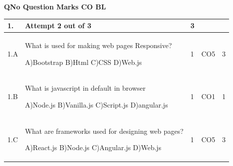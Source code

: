 \documentclass[12pt]{article}
\begin{document}
	\begin{flushleft}
	\bf{QNo}\hspace{1.2cm} \bf{Question} \hspace{5.5cm}  \bf{Marks} \hspace{0.2cm} \bf{CO} \hspace{0.2cm}	\bf{BL}	
	
\end{flushleft} 
	\begin{tabular}{|L{1cm}|L{8cm}|C{1cm}|C{1cm}|C{1cm}|}\hline
		\bf{1}. & \bf{Attempt} \bf2 \bf{out} of \bf3 & \bf3  & & \\ \hline
				1.A & What is used for making web pages Responsive? \newline
					
		A)Bootstrap\newline
		B)Html\newline
		C)CSS\newline
		D)Web.js &
		1 &
		CO5&
		3 \\ \hline
		
				1.B & What is javascript in default in browser \newline
					
		A)Node.js\newline
		B)Vanilla.js\newline
		C)Script.js\newline
		D)angular.js &
		1 &
		CO1&
		1 \\ \hline
		
				1.C & What are frameworks used for designing web pages? \newline
					
		A)React.js\newline
		B)Node.js\newline
		C)Angular.js\newline
		D)Web.js &
		1 &
		CO5&
		3 \\ \hline
		
		
	\end{tabular}
\end{document}
